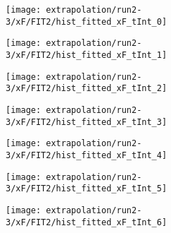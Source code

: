 \begin{figure}
	\centering
	\caption{Fit to the flask subtracted yield ratio with FIT2 for $x_F$ for run 2-3.}
	\label{fig:run2-3_FIT2_xF}
	\begin{subfigure}{0.45\linewidth}
		\texttt{[image: extrapolation/run2-3/xF/FIT2/hist\_fitted\_xF\_tInt\_0]}
	\end{subfigure}
	\begin{subfigure}{0.45\linewidth}
		\texttt{[image: extrapolation/run2-3/xF/FIT2/hist\_fitted\_xF\_tInt\_1]}
	\end{subfigure}
	\begin{subfigure}{0.45\linewidth}
		\texttt{[image: extrapolation/run2-3/xF/FIT2/hist\_fitted\_xF\_tInt\_2]}
	\end{subfigure}
	\begin{subfigure}{0.45\linewidth}
		\texttt{[image: extrapolation/run2-3/xF/FIT2/hist\_fitted\_xF\_tInt\_3]}
	\end{subfigure}
	\begin{subfigure}{0.45\linewidth}
		\texttt{[image: extrapolation/run2-3/xF/FIT2/hist\_fitted\_xF\_tInt\_4]}
	\end{subfigure}
	\begin{subfigure}{0.45\linewidth}
		\texttt{[image: extrapolation/run2-3/xF/FIT2/hist\_fitted\_xF\_tInt\_5]}
	\end{subfigure}
	\begin{subfigure}{0.45\linewidth}
		\texttt{[image: extrapolation/run2-3/xF/FIT2/hist\_fitted\_xF\_tInt\_6]}
	\end{subfigure}
\end{figure}
